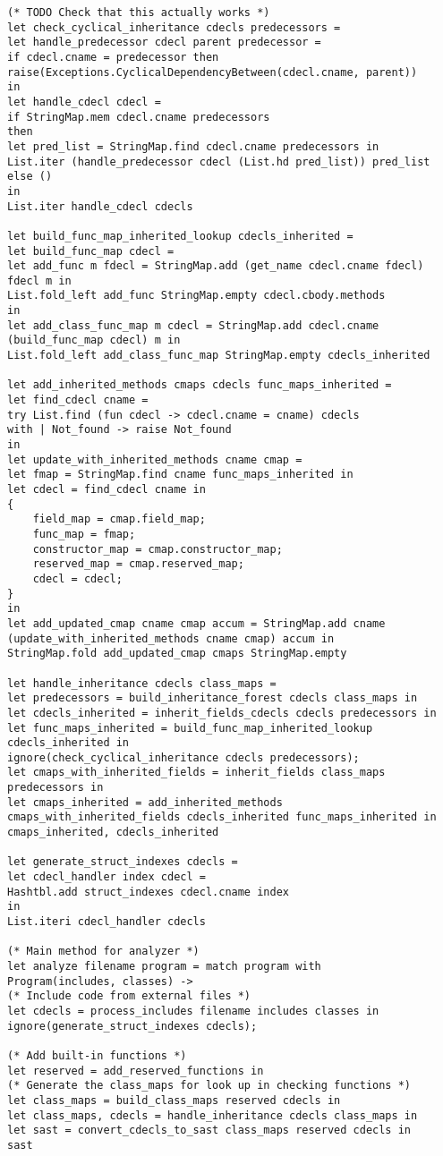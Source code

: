 \begin{verbatim}
(* TODO Check that this actually works *)
let check_cyclical_inheritance cdecls predecessors = 
let handle_predecessor cdecl parent predecessor =
if cdecl.cname = predecessor then
raise(Exceptions.CyclicalDependencyBetween(cdecl.cname, parent))
in
let handle_cdecl cdecl = 
if StringMap.mem cdecl.cname predecessors
then 
let pred_list = StringMap.find cdecl.cname predecessors in
List.iter (handle_predecessor cdecl (List.hd pred_list)) pred_list
else ()
in
List.iter handle_cdecl cdecls

let build_func_map_inherited_lookup cdecls_inherited = 
let build_func_map cdecl =
let add_func m fdecl = StringMap.add (get_name cdecl.cname fdecl) fdecl m in
List.fold_left add_func StringMap.empty cdecl.cbody.methods
in
let add_class_func_map m cdecl = StringMap.add cdecl.cname (build_func_map cdecl) m in
List.fold_left add_class_func_map StringMap.empty cdecls_inherited

let add_inherited_methods cmaps cdecls func_maps_inherited = 
let find_cdecl cname = 
try List.find (fun cdecl -> cdecl.cname = cname) cdecls
with | Not_found -> raise Not_found
in
let update_with_inherited_methods cname cmap = 
let fmap = StringMap.find cname func_maps_inherited in
let cdecl = find_cdecl cname in
{
	field_map = cmap.field_map;
	func_map = fmap;
	constructor_map = cmap.constructor_map;
	reserved_map = cmap.reserved_map;
	cdecl = cdecl;
}
in
let add_updated_cmap cname cmap accum = StringMap.add cname (update_with_inherited_methods cname cmap) accum in
StringMap.fold add_updated_cmap cmaps StringMap.empty

let handle_inheritance cdecls class_maps = 
let predecessors = build_inheritance_forest cdecls class_maps in
let cdecls_inherited = inherit_fields_cdecls cdecls predecessors in
let func_maps_inherited = build_func_map_inherited_lookup cdecls_inherited in
ignore(check_cyclical_inheritance cdecls predecessors);
let cmaps_with_inherited_fields = inherit_fields class_maps predecessors in
let cmaps_inherited = add_inherited_methods cmaps_with_inherited_fields cdecls_inherited func_maps_inherited in
cmaps_inherited, cdecls_inherited

let generate_struct_indexes cdecls = 
let cdecl_handler index cdecl = 
Hashtbl.add struct_indexes cdecl.cname index
in
List.iteri cdecl_handler cdecls

(* Main method for analyzer *)
let analyze filename program = match program with
Program(includes, classes) ->
(* Include code from external files *)
let cdecls = process_includes filename includes classes in
ignore(generate_struct_indexes cdecls);

(* Add built-in functions *)
let reserved = add_reserved_functions in
(* Generate the class_maps for look up in checking functions *)
let class_maps = build_class_maps reserved cdecls in
let class_maps, cdecls = handle_inheritance cdecls class_maps in
let sast = convert_cdecls_to_sast class_maps reserved cdecls in
sast

\end{verbatim}	